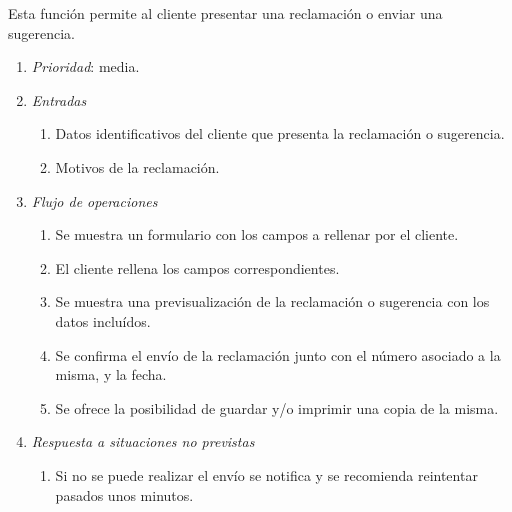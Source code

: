 

	Esta función permite al cliente presentar una reclamación o enviar una sugerencia.

	\begin{enumerate}
		\item \textit{Prioridad}: media.
		\item \textit{Entradas}
		\begin{enumerate}
			\item Datos identificativos del cliente que presenta la reclamación o sugerencia.
			\item Motivos de la reclamación.
		\end{enumerate}
		\item \textit{Flujo de operaciones}
		\begin{enumerate}
			\item Se muestra un formulario con los campos a rellenar por el cliente.
			\item El cliente rellena los campos correspondientes.
			\item Se muestra una previsualización de la reclamación o sugerencia con los datos incluídos.
			\item Se confirma el envío de la reclamación junto con el número asociado a la misma, y la fecha.
			\item Se ofrece la posibilidad de guardar y/o imprimir una copia de la misma.
		\end{enumerate}
		\item \textit{Respuesta a situaciones no previstas}
		\begin{enumerate}
			\item Si no se puede realizar el envío se notifica y se recomienda reintentar pasados unos minutos.
		\end{enumerate}
	\end{enumerate}
